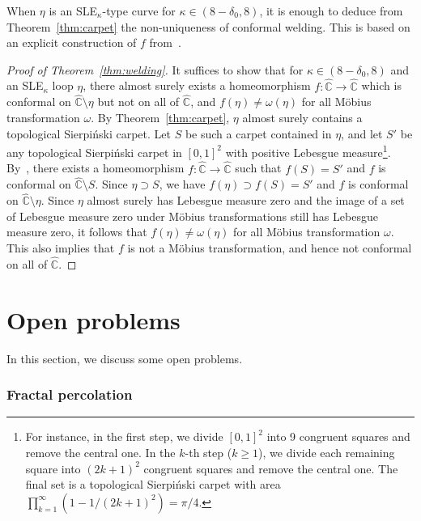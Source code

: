 \documentclass[a4paper]{article}
\numberwithin{equation}{section}
\numberwithin{equation}{section}
\renewcommand{\1}{\mathbf{1}}
\begin{document}
When $\eta$ is an SLE$_\kappa$-type curve for $\kappa \in (8 - \delta_0,8)$, it is enough to deduce from Theorem~\ref{thm:carpet} the non-uniqueness of conformal welding. This is based on an explicit construction of $f$ from~\cite{Ntalampekos-carpet}.

\begin{proof}[Proof of Theorem~\ref{thm:welding}]
    It suffices to show that for $\kappa \in (8 - \delta_0, 8)$ and an SLE$_\kappa$ loop $\eta$, there almost surely exists a homeomorphism $f:\widehat{\mathbb C} \to \widehat{\mathbb C}$ which is conformal on $\widehat{\mathbb C} \setminus \eta$ but not on all of $\widehat{\mathbb C}$, and $f(\eta) \neq \omega(\eta)$ for all M\"obius transformation $\omega$. By Theorem~\ref{thm:carpet}, $\eta$ almost surely contains a topological Sierpi\'nski carpet. Let $S$ be such a carpet contained in $\eta$, and let $S'$ be any topological Sierpi\'nski carpet in $[0,1]^2$ with positive Lebesgue measure\footnote{For instance, in the first step, we divide $[0,1]^2$ into 9 congruent squares and remove the central one. In the $k$-th step ($k \ge 1$), we divide each remaining square into $(2k+1)^2$ congruent squares and remove the central one. The final set is a topological Sierpi\'nski carpet with area $\prod_{k=1}^\infty (1-1/(2k+1)^2)=\pi/4$.}. By~\cite[Theorem 1.3]{Ntalampekos-carpet}, there exists a homeomorphism $f:\widehat{\mathbb{C}} \to \widehat{\mathbb{C}}$ such that $f(S) = S'$ and $f$ is conformal on $\widehat{\mathbb{C}} \setminus S$. Since $\eta \supset S$, we have $f(\eta) \supset f(S) = S'$ and $f$ is conformal on $\widehat{\mathbb C} \setminus \eta$. Since $\eta$ almost surely has Lebesgue measure zero and the image of a set of Lebesgue measure zero under M\"obius transformations still has Lebesgue measure zero, it follows that $f(\eta) \neq \omega(\eta)$ for all M\"obius transformation $\omega$. This also implies that $f$ is not a M\"obius transformation, and hence not conformal on all of $\widehat{\mathbb{C}}$.
\end{proof}

\section{Open problems}\label{sec:open}

In this section, we discuss some open problems.

\subsubsection*{Fractal percolation}
\end{document}
